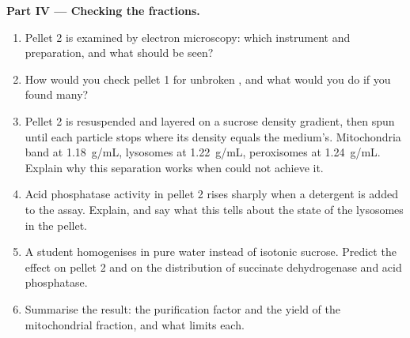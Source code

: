 \begin{problem}
\medskip
\noindent\textbf{Part IV --- Checking the fractions.}
\begin{enumerate}[resume]
  \item Pellet 2 is examined by electron microscopy: which instrument
        and preparation, and what should be seen?
  \item How would you check pellet 1 for unbroken , and what would
        you do if you found many?
  \item Pellet 2 is resuspended and layered on a sucrose density
        gradient, then spun until each particle stops where its density
        equals the medium's. Mitochondria band at \qty{1.18}{g/mL},
        lysosomes at \qty{1.22}{g/mL}, peroxisomes at \qty{1.24}{g/mL}.
        Explain why this separation works when  could not achieve it.
  \item Acid phosphatase activity in pellet 2 rises sharply when a
        detergent is added to the assay. Explain, and say what this
        tells about the state of the lysosomes in the pellet.
  \item A student homogenises in pure water instead of isotonic
        sucrose. Predict the effect on pellet 2 and on the distribution
        of succinate dehydrogenase and acid phosphatase.
  \item Summarise the result: the purification factor and the yield of
        the mitochondrial fraction, and what limits each.
\end{enumerate}
\end{problem}
